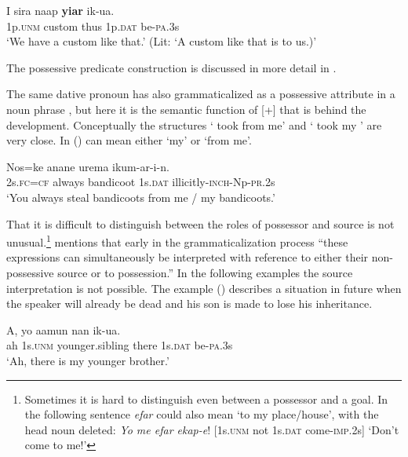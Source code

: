 \ea%
\label{ex:x1788}
\gll I sira naap \textbf{yiar} ik-ua. \\
1p.\textsc{unm} custom thus 1p.\textsc{dat} be-\textsc{pa}.3s\\
\glt`We have a custom like that.' (Lit: `A custom like that is to us.)'
\z

The possessive predicate construction is discussed in more detail in . 

The same dative pronoun has also grammaticalized as a possessive attribute in a noun phrase , but here it is the semantic function of [+]  that is behind the development. Conceptually the structures ` took  from me' and ` took my ' are very close. In ()  can mean either `my' or `from me'. 

\ea%
\label{ex:x581}
\gll Nos=ke anane urema  ikum-ar-i-n. \\
2s.\textsc{fc}=\textsc{cf} always bandicoot 1s.\textsc{dat} illicitly-\textsc{inch}-Np-\textsc{pr}.2s\\
\glt`You always steal bandicoots from me / my bandicoots.'
\z

That it is difficult to distinguish between the roles of possessor and source is not unusual.\footnote{Sometimes it is hard to distinguish even between a possessor and a goal. In the following sentence \textit{efar} could also mean `to my place/house', with the head noun deleted: \textit{Yo me efar ekap-e}! [1s.\textsc{unm} not 1s.\textsc{dat} come-\textsc{imp}.2s] `Don't come to me!' } \citet[133]{Heine1997} mentions that early in the grammaticalization process ``these expressions can simultaneously be interpreted with reference to either their non-possessive source or to possession.'' In the following examples the source interpretation is not possible. The example () describes a situation in future when the speaker will already be dead and his son is made to lose his inheritance.

\ea%
\label{ex:x1861}
\gll A, yo aamun nan  ik-ua. \\
ah 1s.\textsc{unm} younger.sibling there 1s.\textsc{dat} be-\textsc{pa}.3s\\
\glt`Ah, there is my younger brother.'
\z

